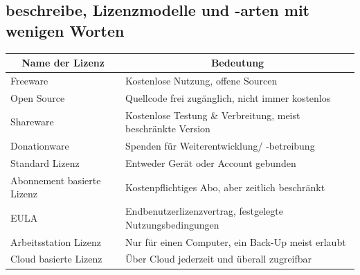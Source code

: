 \documentclass[a4paper]{article}
\begin{document}
    \subsection{\color{red}beschreibe, Lizenzmodelle und -arten mit wenigen Worten}\label{subsec:beschreibe-lizenzmodelle-und--arten-mit-wenigen-worten}
    \begin{center}
        \begin{tabular}{|l|l|}
            \hline
            \multicolumn{1}{|c|}{{\color[HTML]{00D2CB} Name der Lizenz}} & \multicolumn{1}{c|}{{\color[HTML]{00D2CB} Bedeutung}}                                         \\ \hline
            {\color[HTML]{CB0000} Freeware}                              & {\color[HTML]{3166FF} Kostenlose Nutzung, offene Sourcen}                                     \\ \hline
            {\color[HTML]{CB0000} Open Source}                           & {\color[HTML]{3166FF} Quellcode frei zugänglich, nicht immer kostenlos}                       \\ \hline
            {\color[HTML]{CB0000} Shareware}                             & {\color[HTML]{3166FF} Kostenlose Testung \& Verbreitung, meist beschränkte Version}           \\ \hline
            {\color[HTML]{CB0000} Donationware}                          & {\color[HTML]{3166FF} Spenden für Weiterentwicklung/ -betreibung}                             \\ \hline
            {\color[HTML]{CB0000} Standard Lizenz}                       & {\color[HTML]{3166FF} Entweder Gerät oder Account gebunden}                                   \\ \hline
            {\color[HTML]{CB0000} Abonnement basierte Lizenz}            & {\color[HTML]{3166FF} Kostenpflichtiges Abo, aber zeitlich beschränkt}                        \\ \hline
            {\color[HTML]{CB0000} EULA}                                  & {\color[HTML]{3166FF} Endbenutzerlizenzvertrag, festgelegte Nutzungsbedingungen}              \\ \hline
            {\color[HTML]{CB0000} Arbeitsstation Lizenz}                 & {\color[HTML]{3166FF} Nur für einen Computer, ein Back-Up meist erlaubt}                      \\ \hline
            {\color[HTML]{CB0000} Cloud basierte Lizenz}                 & {\color[HTML]{3166FF} Über Cloud jederzeit und überall zugreifbar}                            \\ \hline

\end{tabular}
\end{center}
\end{document}
